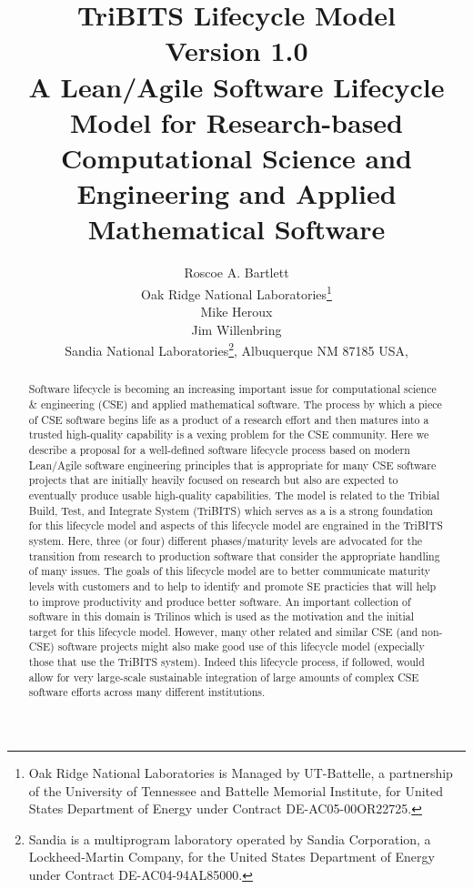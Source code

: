 \documentclass[11pt]{SANDreport}
\title{\center
TriBITS Lifecycle Model \\[2ex] Version 1.0 \\[2ex] \large A
Lean/Agile Software Lifecycle Model for Research-based Computational
Science and Engineering and Applied Mathematical Software }
\author{
Roscoe A. Bartlett \\ Oak Ridge National Laboratories\footnote{Oak
Ridge National Laboratories is Managed by UT-Battelle, a partnership
of the University of Tennessee and Battelle Memorial Institute, for
United States Department of Energy under Contract DE-AC05-00OR22725.} 
\\[2ex] Mike Heroux \\ Jim Willenbring \\ Sandia
National Laboratories\footnote{Sandia is a multiprogram laboratory
operated by Sandia Corporation, a Lockheed-Martin Company, for the
United States Department of Energy under Contract DE-AC04-94AL85000.},
Albuquerque NM 87185 USA, \\ }
\date{}
\begin{document}

\maketitle

%

%
\begin{abstract}
%

Software lifecycle is becoming an increasing important issue for
computational science \& engineering (CSE) and applied mathematical
software.  The process by which a piece of CSE software begins life as
a product of a research effort and then matures into a trusted
high-quality capability is a vexing problem for the CSE community.
Here we describe a proposal for a well-defined software lifecycle
process based on modern Lean/Agile software engineering principles
that is appropriate for many CSE software projects that are initially
heavily focused on research but also are expected to eventually
produce usable high-quality capabilities.  The model is related to the
Tribial Build, Test, and Integrate System (TriBITS) which serves as a
is a strong foundation for this lifecycle model and aspects of this
lifecycle model are engrained in the TriBITS system.  Here, three (or
four) different phases/maturity levels are advocated for the
transition from research to production software that consider the
appropriate handling of many issues.  The goals of this lifecycle
model are to better communicate maturity levels with customers and to
help to identify and promote SE practicies that will help to improve
productivity and produce better software.  An important collection of
software in this domain is Trilinos which is used as the motivation
and the initial target for this lifecycle model.  However, many other
related and similar CSE (and non-CSE) software projects might also
make good use of this lifecycle model (expecially those that use the
TriBITS system).  Indeed this lifecycle process, if followed, would
allow for very large-scale sustainable integration of large amounts of
complex CSE software efforts across many different institutions.

%
\end{abstract}
%

%
%
%
\end{document}
